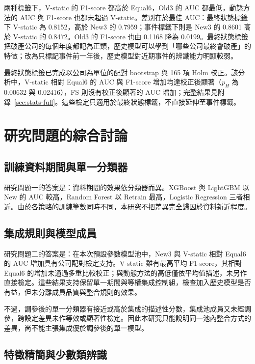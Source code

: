 兩種標籤下，V-static 的 F1-score 都高於 Equal6，Old3 的 AUC 都最低，動態方法的 AUC 與 F1-score 也都未超過 V-static。差別在於最佳 AUC：最終狀態標籤下 V-static 為 0.8152，高於 New3 的 0.7959；事件標籤下則是 New3 的 0.8601 高於 V-static 的 0.8472。Old3 的 F1-score 也由 0.1168 降為 0.0199。最終狀態標籤把破產公司的每個年度都記為正類，歷史模型可以學到「哪些公司最終會破產」的特徵；改為只標記事件前一年後，歷史模型對近期事件的辨識能力明顯較弱。

最終狀態標籤已完成以公司為單位的配對 bootstrap 與 165 項 Holm 校正。該分析中，V-static 相對 Equal6 的 AUC 與 F1-score 增加均達校正後顯著（\(p_H\) 為 0.00632 與 0.02416），FS 則沒有校正後顯著的 AUC 增加；完整結果見附錄~\ref{sec:stats-full}。這些檢定只適用於最終狀態標籤，不直接延伸至事件標籤。

\section{研究問題的綜合討論}\label{sec:results-discussion}

\subsection{訓練資料期間與單一分類器}

研究問題一的答案是：資料期間的效果依分類器而異。XGBoost 與 LightGBM 以 New 的 AUC 較高，Random Forest 以 Retrain 最高，Logistic Regression 三者相近。由於各策略的訓練筆數同時不同，本研究不把差異完全歸因於資料新近程度。

\subsection{集成規則與模型成員}

研究問題二的答案是：在本次預設參數模型池中，New3 與 V-static 相對 Equal6 的 AUC 增加具有公司配對檢定支持。V-static 雖有最高平均 F1-score，其相對 Equal6 的增加未通過多重比較校正；與動態方法的高低僅依平均值描述，未另作直接檢定。這些結果支持保留單一期間與等權集成控制組，檢查加入歷史模型是否有益，但未分離成員品質與整合規則的效果。

不過，調參後的單一分類器有接近或高於集成的描述性分數，集成池成員又未經調參，跨設定差異未作等效或顯著性檢定。因此本研究只能說明同一池內整合方式的差異，尚不能主張集成優於調參後的單一模型。

\subsection{特徵精簡與少數類辨識}

